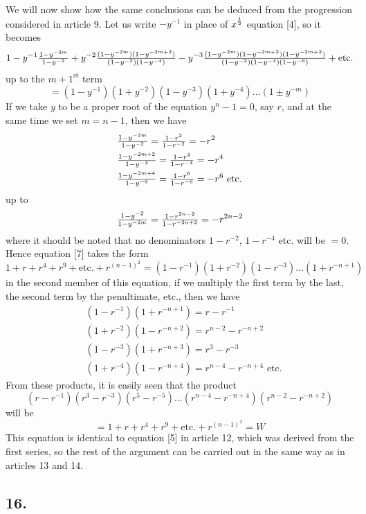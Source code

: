 \documentclass[twoside,12pt]{memoir}
\let\oldfrac\frac
\def\frac#1#2{\mathchoice{\tfrac{#1}{#2}}{\oldfrac{#1}{#2}}{\genfrac{}{}{}{2}{#1}{#2\mathstrut}}{\genfrac{}{}{}{3}{#1}{#2\mathstrut}}}
\begin{document}
We will now show how the same conclusions can be deduced from the progression considered in article 9. Let us write \(-y^{-1}\) in place of \(x^{\frac{1}{2}}\) equation [4], so it becomes
\[1-y^{-1} \frac{1-y^{-2 m}}{1-y^{-2}}+y^{-2} \frac{(1-y^{-2 m})(1-y^{-2 m+2})}{(1-y^{-2})(1-y^{-4})}-y^{-3} \frac{(1-y^{-2 m})(1-y^{-2 m+2})(1-y^{-2 m+2})}{(1-y^{-2})(1-y^{-4})(1-y^{-6})}+\text{etc{.}}\]
up to the \(m+1^{\text{st}}\) term
\[=(1-y^{-1})(1+y^{-2})(1-y^{-3})(1+y^{-4}) \ldots(1 \pm y^{-m})\tag{7}\]
If we take \(y\) to be a proper root of the equation \(y^{n}-1=0\), say \(r\), and at the same time we set \(m=n-1\), then we have
\[\begin{aligned}
& \frac{1-y^{-2 m}}{1-y^{-2}}=\frac{1-r^{2}}{1-r^{-2}}=-r^{2} \\
& \frac{1-y^{-2 m+2}}{1-y^{-4}}=\frac{1-r^{4}}{1-r^{-4}}=-r^{4} \\
& \frac{1-y^{-2 m+4}}{1-y^{-6}}=\frac{1-r^{6}}{1-r^{-6}}=-r^{6} \text{ etc{.}}
\end{aligned}\]
up to
\[\frac{1-y^{-2}}{1-y^{-2 m}}=\frac{1-r^{2 n-2}}{1-r^{-2 n+2}}=-r^{2 n-2}\]
where it should be noted that no denominators \(1-r^{-2}\), \(1-r^{-4}\) etc{.} will be \(=0\). Hence equation [7] takes the form
\[1+r+r^{4}+r^{9}+\text{etc{.}}+r^{(n-1)^{2}}=(1-r^{-1})(1+r^{-2})(1-r^{-3}) \ldots(1+r^{-n+1})\]
in the second member of this equation, if we multiply the first term by the last, the second term by the penultimate, etc{.}, then we have
\[\begin{aligned}
& (1-r^{-1})(1+r^{-n+1})=r-r^{-1} \\
& (1+r^{-2})(1-r^{-n+2})=r^{n-2}-r^{-n+2} \\
& (1-r^{-3})(1+r^{-n+3})=r^{3}-r^{-3} \\
& (1+r^{-4})(1-r^{-n+4})=r^{n-4}-r^{-n+4} \text{ etc{.}}
\end{aligned}\]
From these products, it is easily seen that the product
\[(r-r^{-1})(r^{3}-r^{-3})(r^{5}-r^{-5}) \ldots(r^{n-4}-r^{-n+4})(r^{n-2}-r^{-n+2})\]
will be
\[=1+r+r^{4}+r^{9}+\text{etc{.}}+r^{(n-1)^{2}}=W\]
This equation is identical to equation [5] in article 12, which was derived from the first series, so the rest of the argument can be carried out in the same way as in articles 13 and 14.
%

\subsection*{16.}
\end{document}
